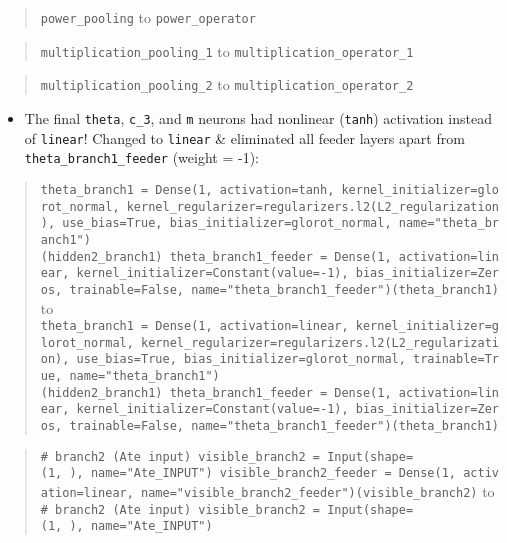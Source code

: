\documentclass[11pt]{article}
\providecommand{\tightlist}{%
      \setlength{\itemsep}{0pt}\setlength{\parskip}{0pt}}
\begin{document}
\begin{quote}
\texttt{power\_pooling} to \texttt{power\_operator}
\end{quote}

\begin{quote}
\texttt{multiplication\_pooling\_1} to
\texttt{multiplication\_operator\_1}
\end{quote}

\begin{quote}
\texttt{multiplication\_pooling\_2} to
\texttt{multiplication\_operator\_2}
\end{quote}

\begin{itemize}
\tightlist
\item
  The final \texttt{theta}, \texttt{c\_3}, and \texttt{m} neurons had
  nonlinear (\texttt{tanh}) activation instead of \texttt{linear}!
  Changed to \texttt{linear} \& eliminated all feeder layers apart from
  \texttt{theta\_branch1\_feeder} (weight = -1):
\end{itemize}

\begin{quote}
\texttt{theta\_branch1\ =\ Dense(1,\ activation=\textquotesingle{}tanh\textquotesingle{},\ kernel\_initializer=\textquotesingle{}glorot\_normal\textquotesingle{},\ kernel\_regularizer=regularizers.l2(L2\_regularization),\ use\_bias=True,\ bias\_initializer=\textquotesingle{}glorot\_normal\textquotesingle{},\ name="theta\_branch1")(hidden2\_branch1)\ theta\_branch1\_feeder\ =\ Dense(1,\ activation=\textquotesingle{}linear\textquotesingle{},\ kernel\_initializer=Constant(value=-1),\ bias\_initializer=\textquotesingle{}Zeros\textquotesingle{},\ trainable=False,\ name="theta\_branch1\_feeder")(theta\_branch1)}
to
\texttt{theta\_branch1\ =\ Dense(1,\ activation=\textquotesingle{}linear\textquotesingle{},\ kernel\_initializer=\textquotesingle{}glorot\_normal\textquotesingle{},\ kernel\_regularizer=regularizers.l2(L2\_regularization),\ use\_bias=True,\ bias\_initializer=\textquotesingle{}glorot\_normal\textquotesingle{},\ trainable=True,\ name="theta\_branch1")(hidden2\_branch1)\ theta\_branch1\_feeder\ =\ Dense(1,\ activation=\textquotesingle{}linear\textquotesingle{},\ kernel\_initializer=Constant(value=-1),\ bias\_initializer=\textquotesingle{}Zeros\textquotesingle{},\ trainable=False,\ name="theta\_branch1\_feeder")(theta\_branch1)}
\end{quote}

\begin{quote}
\texttt{\#\ branch2\ (Ate\ input)\ visible\_branch2\ =\ Input(shape=(1,\ ),\ name="Ate\_INPUT")\ visible\_branch2\_feeder\ =\ Dense(1,\ activation=\textquotesingle{}linear\textquotesingle{},\ name="visible\_branch2\_feeder")(visible\_branch2)}
to
\texttt{\#\ branch2\ (Ate\ input)\ visible\_branch2\ =\ Input(shape=(1,\ ),\ name="Ate\_INPUT")}
\end{quote}
\end{document}
